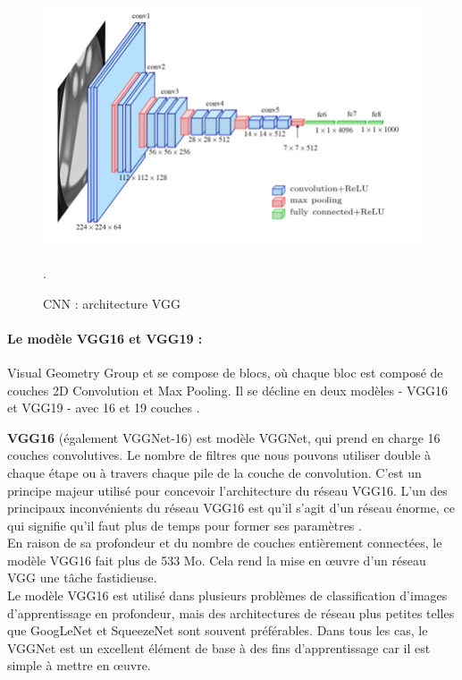 	
	\begin{figure}[H]%
		\centering
		\includegraphics[width=\textwidth]{images/VGG-16-network-architecture.png}
		\caption{CNN : architecture VGG \cite{ml2008python}}.
		\label{fig:VGG_network}
	\end{figure}

	\paragraph{Le modèle VGG16 et VGG19 :}
	
	Visual Geometry Group et se compose de blocs, où chaque bloc est composé de couches 2D Convolution et Max Pooling. Il se décline en deux modèles - VGG16 et VGG19 - avec 16 et 19 couches \cite{yu2016visualizing}.
	
	\textbf{VGG16} (également VGGNet-16) est modèle VGGNet, qui prend en charge 16 couches convolutives.
	Le nombre de filtres que nous pouvons utiliser double à chaque étape ou à travers chaque pile de la couche de convolution. C'est un principe majeur utilisé pour concevoir l'architecture du réseau VGG16. L'un des principaux inconvénients du réseau VGG16 est qu'il s'agit d'un réseau énorme, ce qui signifie qu'il faut plus de temps pour former ses paramètres \cite{yu2016visualizing}.\\
	En raison de sa profondeur et du nombre de couches entièrement connectées, le modèle VGG16 fait plus de 533 Mo. Cela rend la mise en œuvre d'un réseau VGG une tâche fastidieuse.\\
	Le modèle VGG16 est utilisé dans plusieurs problèmes de classification d'images d'apprentissage en profondeur, mais des architectures de réseau plus petites telles que GoogLeNet et SqueezeNet sont souvent préférables. Dans tous les cas, le VGGNet est un excellent élément de base à des fins d'apprentissage car il est simple à mettre en œuvre.
	
